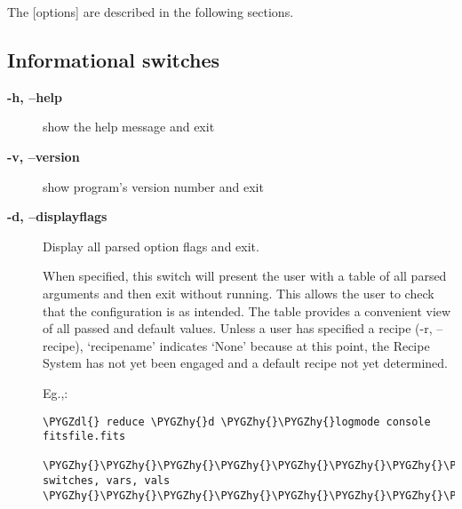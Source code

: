 \documentclass[letterpaper,10pt,english]{sphinxmanual}
\def\PYGZdl{\char`\$}
\def\PYGZhy{\char`\-}
\begin{document}
The {[}options{]} are described in the following sections.


\subsection{Informational switches}
\label{interfaces:informational-switches}\begin{description}
\item[{\textbf{-h, --help}}] \leavevmode
show the help message and exit

\item[{\textbf{-v, --version}}] \leavevmode
show program's version number and exit

\item[{\textbf{-d, --displayflags}}] \leavevmode
Display all parsed option flags and exit.

When specified, this switch will present the user with a table of all
parsed arguments and then exit without running. This allows the user to
check that the configuration is as intended. The table provides a convenient
view of all passed and default values. Unless a user has specified a
recipe (-r, --recipe), `recipename' indicates `None' because at this point,
the Recipe System has not yet been engaged and a default recipe not yet
determined.

Eg.,:

\begin{Verbatim}[commandchars=\\\{\}]
\PYGZdl{} reduce \PYGZhy{}d \PYGZhy{}\PYGZhy{}logmode console fitsfile.fits

\PYGZhy{}\PYGZhy{}\PYGZhy{}\PYGZhy{}\PYGZhy{}\PYGZhy{}\PYGZhy{}\PYGZhy{}\PYGZhy{}\PYGZhy{}\PYGZhy{}\PYGZhy{}\PYGZhy{}\PYGZhy{}\PYGZhy{}\PYGZhy{}\PYGZhy{}\PYGZhy{}\PYGZhy{}\PYGZhy{}   switches, vars, vals  \PYGZhy{}\PYGZhy{}\PYGZhy{}\PYGZhy{}\PYGZhy{}\PYGZhy{}\PYGZhy{}\PYGZhy{}\PYGZhy{}\PYGZhy{}\PYGZhy{}\PYGZhy{}\PYGZhy{}\PYGZhy{}\PYGZhy{}\PYGZhy{}\PYGZhy{}\PYGZhy{}\PYGZhy{}\PYGZhy{}


\end{Verbatim}
\end{description}
\end{document}
